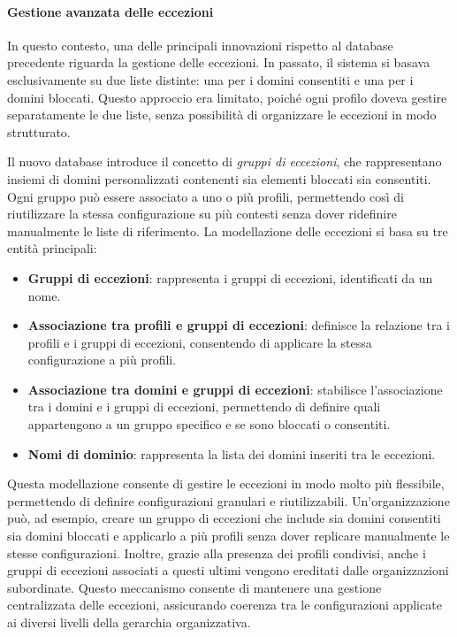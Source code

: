 \paragraph{Gestione avanzata delle eccezioni}
In questo contesto, una delle principali innovazioni rispetto al database precedente riguarda la gestione delle eccezioni. In passato, il sistema si basava esclusivamente su due liste distinte: una per i domini consentiti e una per i domini bloccati. Questo approccio era limitato, poiché ogni profilo doveva gestire separatamente le due liste, senza possibilità di organizzare le eccezioni in modo strutturato.

Il nuovo database introduce il concetto di \emph{gruppi di eccezioni}, che rappresentano insiemi di domini personalizzati contenenti sia elementi bloccati sia consentiti. Ogni gruppo può essere associato a uno o più profili, permettendo così di riutilizzare la stessa configurazione su più contesti senza dover ridefinire manualmente le liste di riferimento. La modellazione delle eccezioni si basa su tre entità principali:
\begin{itemize}
  \item \textbf{Gruppi di eccezioni}: rappresenta i gruppi di eccezioni, identificati da un nome.
  \item \textbf{Associazione tra profili e gruppi di eccezioni}: definisce la relazione tra i profili e i gruppi di eccezioni, consentendo di applicare la stessa configurazione a più profili.
  \item \textbf{Associazione tra domini e gruppi di eccezioni}: stabilisce l'associazione tra i domini e i gruppi di eccezioni, permettendo di definire quali appartengono a un gruppo specifico e se sono bloccati o consentiti.
  \item \textbf{Nomi di dominio}: rappresenta la lista dei domini inseriti tra le eccezioni.
\end{itemize}

Questa modellazione consente di gestire le eccezioni in modo molto più flessibile, permettendo di definire configurazioni granulari e riutilizzabili. Un’organizzazione può, ad esempio, creare un gruppo di eccezioni che include sia domini consentiti sia domini bloccati e applicarlo a più profili senza dover replicare manualmente le stesse configurazioni. Inoltre, grazie alla presenza dei profili condivisi, anche i gruppi di eccezioni associati a questi ultimi vengono ereditati dalle organizzazioni subordinate. Questo meccanismo consente di mantenere una gestione centralizzata delle eccezioni, assicurando coerenza tra le configurazioni applicate ai diversi livelli della gerarchia organizzativa.

